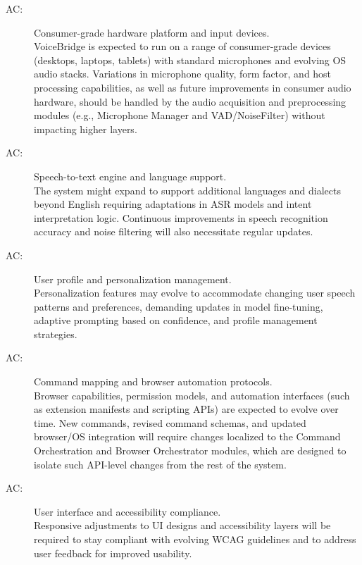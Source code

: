 \documentclass[12pt, titlepage]{article}
\newcounter{acnum}
\newcommand{\actheacnum}{AC\theacnum}
\begin{document}
\begin{description}

\item[ \actheacnum \label{acHardware}:]
Consumer-grade hardware platform and input devices. \\
VoiceBridge is expected to run on a range of consumer-grade devices (desktops, laptops, tablets) with standard microphones and evolving OS audio stacks. Variations in microphone quality, form factor, and host processing capabilities, as well as future improvements in consumer audio hardware, should be handled by the audio acquisition and preprocessing modules (e.g., Microphone Manager and VAD/NoiseFilter) without impacting higher layers.

\item[ \actheacnum \label{acSpeechModel}:]
Speech-to-text engine and language support. \\
The system might expand to support additional languages and dialects beyond English requiring adaptations in ASR models and intent interpretation logic. Continuous improvements in speech recognition accuracy and noise filtering will also necessitate regular updates.

\item[ \actheacnum \label{acUserPersonalization}:]
User profile and personalization management. \\
Personalization features may evolve to accommodate changing user speech patterns and preferences, demanding updates in model fine-tuning, adaptive prompting based on confidence, and profile management strategies.

\item[ \actheacnum \label{acCommandSupport}:]
Command mapping and browser automation protocols. \\
Browser capabilities, permission models, and automation interfaces (such as extension manifests and scripting APIs) are expected to evolve over time. New commands, revised command schemas, and updated browser/OS integration will require changes localized to the Command Orchestration and Browser Orchestrator modules, which are designed to isolate such API-level changes from the rest of the system.


\item[ \actheacnum \label{acUIAndAccessibility}:]
User interface and accessibility compliance. \\
Responsive adjustments to UI designs and accessibility layers will be required to stay compliant with evolving WCAG guidelines and to address user feedback for improved usability.


\end{description}
\end{document}
